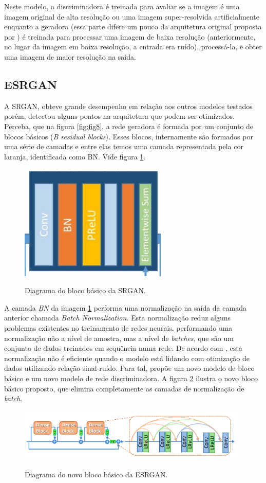 Neste modelo, a discriminadora é treinada para avaliar se a imagem é uma imagem original de alta resolução ou uma imagem super-resolvida artificialmente \cite{ledig_photo-realistic_2017} enquanto a geradora (essa parte difere um pouco da arquitetura original proposta por \cite{goodfellow_generative_2014}) é treinada para processar uma imagem de baixa resolução (anteriormente, no lugar da imagem em baixa resolução, a entrada era ruído), processá-la, e obter uma imagem de maior resolução na saída.

\subsection{ESRGAN}

A SRGAN, obteve grande desempenho em relação aos outros modelos testados porém, \cite{wang_esrgan_2018} detectou alguns pontos na arquitetura que podem ser otimizados. Perceba, que na figura \ref{fig:fig8}, a rede geradora é formada por um conjunto de blocos básicos (\textit{B residual blocks}). Esses blocos, internamente são formados por uma série de camadas e entre elas temos uma camada representada pela cor laranja, identificada como BN. Vide figura \ref{fig:fig12}.

\begin{figure}[H]
    \centering
    \caption{Diagrama do bloco básico da SRGAN.}
    \includegraphics[width=7cm]{fig/basic-block.png}
    \label{fig:fig12}
\end{figure}

A camada \textit{BN} da imagem \ref{fig:fig12} performa uma normalização na saída da camada anterior chamada \textit{Batch Normalization}. Esta normalização reduz alguns problemas existentes no treinamento de redes neurais, performando uma normalização não a nível de amostra, mas a nível de \textit{batches}, que são um conjunto de dados treinados em sequência numa rede. De acordo com \cite{wang_esrgan_2018}, esta normalização não é eficiente quando o modelo está lidando com otimização de dados utilizando relação sinal-ruído. Para tal, \cite{wang_esrgan_2018} propõe um novo modelo de bloco básico e um novo modelo de rede discriminadora. A figura \ref{fig:fig13} ilustra o novo bloco básico proposto, que elimina completamente as camadas de normalização de \textit{batch}.
 
\begin{figure}[H]
    \centering
    \caption{Diagrama do novo bloco básico da ESRGAN.}
    \includegraphics[width=11cm]{fig/new-basic-block.png}
    \label{fig:fig13}
\end{figure} 
